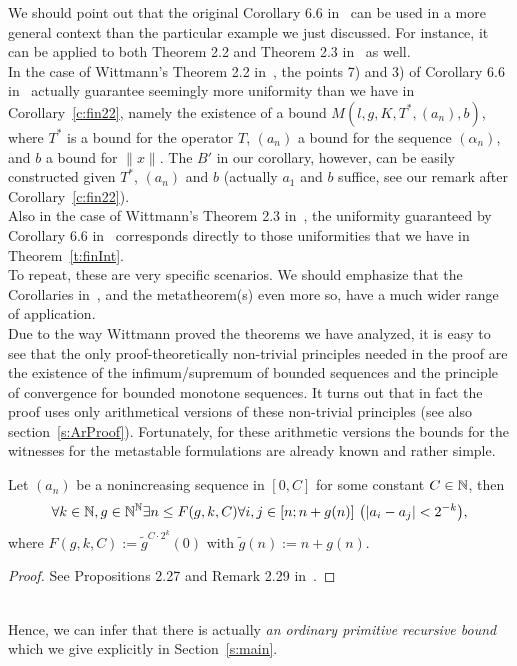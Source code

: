 We should point out that the original Corollary 6.6 in~\cite{GK08} can be used
in a more general context than the particular example we just discussed. For instance, it can be 
applied to both Theorem 2.2 and Theorem 2.3 in~\cite{Wittmann90} as well.\\
In the case of Wittmann's Theorem 2.2 in~\cite{Wittmann90}, the points 7) and 3) of Corollary 6.6 in~\cite{GK08} actually guarantee seemingly more uniformity
than we have in Corollary~\ref{c:fin22}, namely the existence of a bound $M(l,g,K,T^*,(a_n),b)$, where $T^*$ is a bound for the operator $T$,
$(a_n)$ a bound for the sequence $(\alpha_n)$, and $b$ a bound for $\|x\|$. %
The $B'$ in our corollary, however, can be easily constructed given $T^*$, $(a_n)$ and $b$ 
(actually $a_1$ and $b$ suffice, see our remark after Corollary~\ref{c:fin22}).\\
Also in the case of Wittmann's Theorem 2.3 in~\cite{Wittmann90},
the uniformity guaranteed by Corollary 6.6 in~\cite{GK08} corresponds
directly to those uniformities that we have in Theorem~\ref{t:finInt}.\\
To repeat, these are very specific scenarios. We should emphasize that the 
Corollaries in~\cite{GK08}, and 
the metatheorem(s) even more so, have a much wider range of application.\\

Due to the way Wittmann proved the theorems we have analyzed, it is easy to see 
that the only proof-theoretically non-trivial principles needed in the proof are 
the existence of the infimum/supremum of bounded sequences and 
the principle of convergence for bounded monotone sequences.
It turns out that in fact the proof uses only arithmetical versions of
these non-trivial principles (see also section~\ref{s:ArProof}).
Fortunately, for these arithmetic versions the bounds for the witnesses for the metastable
formulations are already known and rather simple.
\begin{prop}\label{p:Ulrich}
Let $(a_n)$ be a nonincreasing sequence in $[0,C]$ for some constant $C\in\mathbb{N}$, then
\[ \forall k\in\NN,g\in\NN^\NN\exists n\leq F(g,k,C)\forall i,j\in[n;n+g(n)]\ \big(|a_i-a_j|<2^{-k}\big), \]
where $F(g,k,C):={\tilde g}^{C\cdot 2^k}(0)$ with $\tilde g(n):=n+g(n)$.
\end{prop}
\begin{proof}
See Propositions 2.27 and Remark 2.29 in~\cite{Kohlenbach08}.
\end{proof}\\
Hence, we can infer that there is actually {\em an ordinary primitive recursive bound} %
which we give explicitly in Section~\ref{s:main}.
